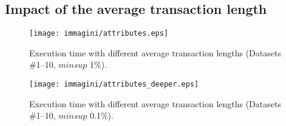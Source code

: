 



\subsection{Impact of the average transaction length}
\label{attributes_exp}

\begin{figure}[!t]
\texttt{[image: immagini/attributes.eps]}
\caption{Execution time with different average transaction lengths %
(Datasets \#1--10, $minsup$ 1\%).}
\label{attributes}
\end{figure}

\begin{figure}[!t]
\texttt{[image: immagini/attributes\_deeper.eps]}
\caption{Execution time with different average transaction lengths %
(Datasets \#1--10, $minsup$ 0.1\%).}
\label{attributes_deeper}
\end{figure}

